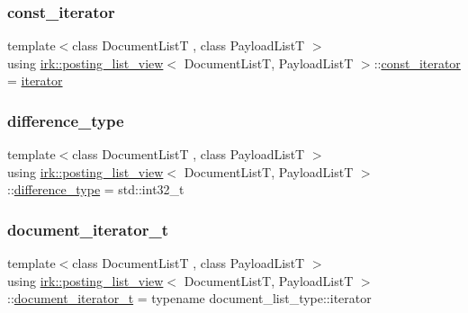 \subsubsection{\texorpdfstring{const\+\_\+iterator}{const\_iterator}}
{\footnotesize\ttfamily template$<$class Document\+ListT , class Payload\+ListT $>$ \\
using \mbox{\hyperlink{classirk_1_1posting__list__view}{irk\+::posting\+\_\+list\+\_\+view}}$<$ Document\+ListT, Payload\+ListT $>$\+::\mbox{\hyperlink{classirk_1_1posting__list__view_ae21b790c3e482f513bb41d4f8e7ae0c9}{const\+\_\+iterator}} =  \mbox{\hyperlink{classirk_1_1posting__list__view_1_1iterator}{iterator}}}

\mbox{\label{classirk_1_1posting__list__view_af57ab26b3de14b52ca2150cd90288567}} 
\subsubsection{\texorpdfstring{difference\+\_\+type}{difference\_type}}
{\footnotesize\ttfamily template$<$class Document\+ListT , class Payload\+ListT $>$ \\
using \mbox{\hyperlink{classirk_1_1posting__list__view}{irk\+::posting\+\_\+list\+\_\+view}}$<$ Document\+ListT, Payload\+ListT $>$\+::\mbox{\hyperlink{classirk_1_1posting__list__view_af57ab26b3de14b52ca2150cd90288567}{difference\+\_\+type}} =  std\+::int32\+\_\+t}

\mbox{\label{classirk_1_1posting__list__view_abaca622760e6da2c67d55cf35207250f}} 
\subsubsection{\texorpdfstring{document\+\_\+iterator\+\_\+t}{document\_iterator\_t}}
{\footnotesize\ttfamily template$<$class Document\+ListT , class Payload\+ListT $>$ \\
using \mbox{\hyperlink{classirk_1_1posting__list__view}{irk\+::posting\+\_\+list\+\_\+view}}$<$ Document\+ListT, Payload\+ListT $>$\+::\mbox{\hyperlink{classirk_1_1posting__list__view_abaca622760e6da2c67d55cf35207250f}{document\+\_\+iterator\+\_\+t}} =  typename document\+\_\+list\+\_\+type\+::iterator}

